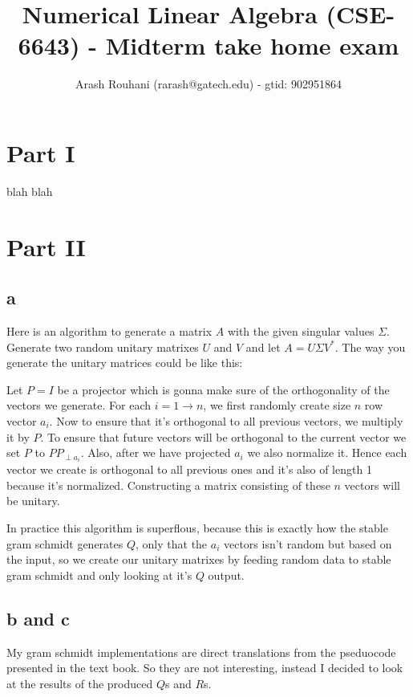 \documentclass[a4paper,11pt]{article}
\title{Numerical Linear Algebra (CSE-6643) - Midterm take home exam}
\author{Arash Rouhani (rarash@gatech.edu) - gtid: 902951864}
\begin{document}
\maketitle

\section{Part I}

blah blah

\section{Part II}

\subsection{a}

Here is an algorithm to generate a matrix $A$ with the given singular values
$\Sigma$. Generate two random unitary matrixes $U$ and $V$ and let $A = U
\Sigma V^*$. The way you generate the unitary matrices could be like this:

Let $P=I$ be a projector which is gonna make sure of the orthogonality of the
vectors we generate. For each $i=1 \to n$, we first randomly create size $n$
row vector $a_i$. Now to ensure that it's orthogonal to all previous vectors,
we multiply it by $P$. To ensure that future vectors will be orthogonal to the
current vector we set $P$ to $P P_{\perp a_i}$. Also, after we have projected
$a_i$ we also normalize it. Hence each vector we create is orthogonal to all
previous ones and it's also of length 1 because it's normalized. Constructing
a matrix consisting of these $n$ vectors will be unitary.

In practice this algorithm is superflous, because this is exactly
how the stable gram schmidt generates $Q$, only that the $a_i$ vectors isn't
random but based on the input, so we create our unitary matrixes by feeding
random data to stable gram schmidt and only looking at it's $Q$ output.

\subsection{b and c}

My gram schmidt implementations are direct translations from the
pseduocode presented in the text book. So they are not interesting,
instead I decided to look at the results of the produced $Q$s and $R$s.
\end{document}
